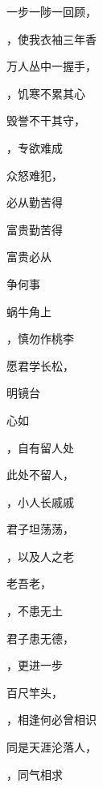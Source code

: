 \documentclass[12pt, a4paper, addpoints]{exam}
\begin{document}
\begin{multicols}{2}
\begin{questions}
\question[1] 一步一陟一回顾，\uline{\qquad\qquad\qquad}

\question[1] \uline{\qquad\qquad\qquad}，使我衣袖三年香

\question[1] 万人丛中一握手，\uline{\qquad\qquad\qquad}

\question[1] \uline{\qquad\qquad\qquad}，饥寒不累其心

\question[1] 毁誉不干其守，\uline{\qquad\qquad\qquad}

\question[1] \uline{\qquad\qquad\qquad}，专欲难成

\question[1] 众怒难犯，\uline{\qquad\qquad\qquad}

\question[1] \uline{\qquad\qquad\qquad}必从勤苦得

\question[1] 富贵\uline{\qquad\qquad\qquad}勤苦得

\question[1] 富贵必从\uline{\qquad\qquad\qquad}

\question[1] \uline{\qquad\qquad\qquad}争何事

\question[1] 蜗牛角上\uline{\qquad\qquad\qquad}

\question[1] \uline{\qquad\qquad\qquad}，慎勿作桃李

\question[1] 愿君学长松，\uline{\qquad\qquad\qquad}

\question[1] \uline{\qquad\qquad\qquad}明镜台

\question[1] 心如\uline{\qquad\qquad\qquad}

\question[1] \uline{\qquad\qquad\qquad}，自有留人处

\question[1] 此处不留人，\uline{\qquad\qquad\qquad}

\question[1] \uline{\qquad\qquad\qquad}，小人长戚戚

\question[1] 君子坦荡荡，\uline{\qquad\qquad\qquad}

\question[1] \uline{\qquad\qquad\qquad}，以及人之老

\question[1] 老吾老，\uline{\qquad\qquad\qquad}

\question[1] \uline{\qquad\qquad\qquad}，不患无土

\question[1] 君子患无德，\uline{\qquad\qquad\qquad}

\question[1] \uline{\qquad\qquad\qquad}，更进一步

\question[1] 百尺竿头，\uline{\qquad\qquad\qquad}

\question[1] \uline{\qquad\qquad\qquad}，相逢何必曾相识

\question[1] 同是天涯沦落人，\uline{\qquad\qquad\qquad}

\question[1] \uline{\qquad\qquad\qquad}，同气相求


\end{questions}
\end{multicols}
\end{document}
